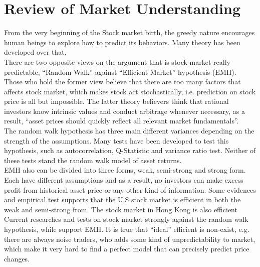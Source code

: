 \section{Review of Market Understanding}
\label{sec:mark_prediction}
From the very beginning of the Stock market birth, the greedy nature encourages human beings to explore how to predict its behaviors. Many theory has been developed over that.\\


There are two opposite views on the argument that is stock market really predictable, “Random Walk” against “Efficient Market” hypothesis (EMH)\cite[Section~3.2, p.~24]{1_shadbolttaylor_2002}. Those who hold the former view believe that there are too many factors that affects stock market, which makes stock act stochastically, i.e. prediction on stock price is all but impossible. The latter theory believers think that rational investors know intrinsic values and conduct arbitrage whenever necessary, as a result, “asset prices should quickly reflect all relevant market fundamentals”\cite[Chapter~1, p.~7]{1_wong_1997}.\\


The random walk hypothesis has three main different variances depending on the strength of the assumptions\cite[Section~3.2, p.~24--25]{1_shadbolttaylor_2002}. Many tests have been developed to test this hypothesis, such as autocorrelation, Q-Statistic and variance ratio test\cite[Section~3.4, p.~28--31]{1_shadbolttaylor_2002}. Neither of these tests stand the random walk model of asset returns.\\


EMH also can be divided into three forms\cite[Chapter~1, p.~7]{1_wong_1997}, weak, semi-strong and strong form. Each have different assumptions and as a result, no investors can make excess profit from historical asset price or any other kind of information. Some evidences and empirical test supports that the U.S stock market is efficient in both the weak and semi-strong from\cite[Chapter~1, p.~7--8]{1_wong_1997}. The stock market in Hong Kong is also efficient\cite{su2015efficiency}\\


Current researches and tests on stock market strongly against the random walk hypothesis, while support EMH. It is true that “ideal” efficient is non-exist, e.g. there are always noise traders\cite{de1990noise}, who adds some kind of unpredictability to market, which make it very hard to find a perfect model that can precisely predict price changes.


